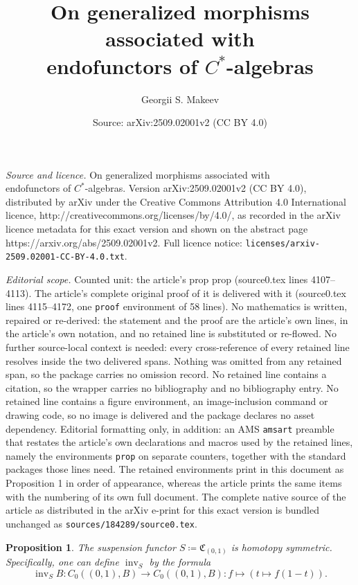 \documentclass[10pt,a4paper]{amsart}
\title{On generalized morphisms associated with \\ endofunctors of $C^*$-algebras}
\author{Georgii S. Makeev}
\date{Source: arXiv:2509.02001v2 (CC BY 4.0)}
\newtheorem{prop}{Proposition}
\newcommand{\C}{\mathfrak{C}^{\,}}
\newcommand{\inv}{\operatorname{inv}}
\begin{document}
\maketitle

\noindent\emph{Source and licence.} On generalized morphisms associated with \\ endofunctors of $C^*$-algebras. Version arXiv:2509.02001v2 (CC BY 4.0), distributed by arXiv under the Creative Commons Attribution 4.0 International licence, http://creativecommons.org/licenses/by/4.0/, as recorded in the arXiv licence metadata for this exact version and shown on the abstract page https://arxiv.org/abs/2509.02001v2. Full licence notice: \texttt{licenses/arxiv-2509.02001-CC-BY-4.0.txt}.\par\smallskip

\noindent\textit{Editorial scope.} Counted unit: the article's prop prop (source0.tex lines 4107--4113). The article's complete original proof of it is delivered with it (source0.tex lines 4115--4172, one \texttt{proof} environment of 58 lines). No mathematics is written, repaired or re-derived: the statement and the proof are the article's own lines, in the article's own notation, and no retained line is substituted or re-flowed.  No further source-local context is needed: every cross-reference of every retained line resolves inside the two delivered spans.  Nothing was omitted from any retained span, so the package carries no omission record.  No retained line contains a citation, so the wrapper carries no bibliography and no bibliography entry.  No retained line contains a figure environment, an image-inclusion command or drawing code, so no image is delivered and the package declares no asset dependency.  Editorial formatting only, in addition: an AMS \texttt{amsart} preamble that restates the article's own declarations and macros used by the retained lines, namely the environments \texttt{prop} on separate counters, together with the standard packages those lines need.  The retained environments print in this document as Proposition 1 in order of appearance, whereas the article prints the same items with the numbering of its own full document.  The complete native source of the article as distributed in the arXiv e-print for this exact version is bundled unchanged as \texttt{sources/184289/source0.tex}.
\begin{prop}
The suspension functor $S\coloneqq\C_{(0,1)}$ is homotopy symmetric.
Specifically, one can define $\inv_{S}$ by the formula
\[
\inv_{S}B\colon C_{0}((0,1),B)\to C_{0}((0,1),B)\colon f\mapsto(t\mapsto f(1-t)).
\]
\end{prop}
\end{document}
